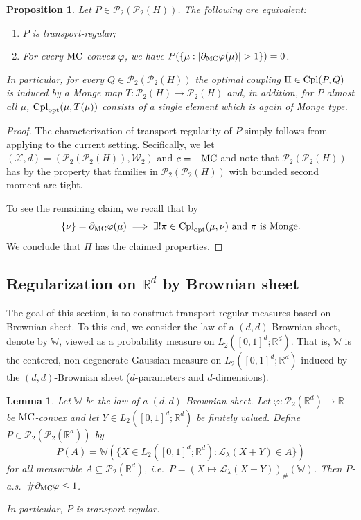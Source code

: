 \documentclass[a4paper]{amsart}
\numberwithin{theorem}{section}
\newtheorem{lemma}[theorem]{Lemma}
\newtheorem{proposition}[theorem]{Proposition}
\theoremstyle{definition}
\newcommand{\R}{\mathbb{R}}
\newcommand{\law}{\mathcal{L}}
\newcommand{\cpl}{\textup{Cpl}}
\newcommand{\W}{\mathcal{W}}
\newcommand{\WW}{\mathbb{W}}
\newcommand{\Pc}{\mathcal P}
\newcommand{\cplopt}{\cpl_{\rm opt}}
\renewcommand{\H}{H}
\renewcommand{\phi}{\varphi}
\newcommand{\mc}{\textup{MC}}
\begin{document}
\begin{proposition} \label{prop:TR=>HMonge}
    Let $P \in \Pc_2(\Pc_2(\H))$. The following are equivalent:
    \begin{enumerate}
        \item $P$ is transport-regular;
        \item For every $\mc$-convex $\phi$, we have $P(\{ \mu : |\partial_\mc \phi(\mu)| > 1 \}) = 0$.
    \end{enumerate}
    In particular, for every $Q \in \Pc_2(\Pc_2(\H))$ the optimal coupling $\Pi \in \cpl(P,Q)$ is induced by a Monge map $T:\Pc_2(\H) \to \Pc_2(\H)$ and, in addition, for $P$ almost all $\mu$, $\cplopt(\mu, T(\mu))$  consists of a single element which is again of Monge type.
\end{proposition}

\begin{proof}
    The characterization of transport-regularity of $P$ simply follows from applying  to the current setting. Secifically, we let $(\mathcal X,d) = (\Pc_2(\Pc_2(\H)),\W_2)$ and $c = -\mc$ and note that $\Pc_2(\Pc_2(\H))$ has by \cite[Lemma 2.3]{BaBePa18} the property that families in $\Pc_2(\Pc_2(\H))$ with bounded second moment are tight.

    To see the remaining claim, we recall that by 
    \[
        \{ \nu \} = \partial_\mc \phi(\mu) \implies
        \exists! \pi \in \cplopt(\mu,\nu) \text{ and }\pi\text{ is Monge}.
    \]
    We conclude that $\Pi$ has the claimed properties.
\end{proof}




\subsection{Regularization on $\R^d$ by Brownian sheet}

The goal of this section, is to construct transport regular measures based on Brownian sheet.
To this end, we consider the law of a $(d,d)$-Brownian sheet, denote by $\mathbb W$, viewed as a probability measure on $L_2([0,1]^d;\R^d)$.
That is, $\mathbb W$ is the centered, non-degenerate Gaussian measure on $L_2([0,1]^d;\R^d)$ induced by the $(d,d)$-Brownian sheet ($d$-parameters and $d$-dimensions).

\begin{lemma} \label{lem:BMDifferentiable}
    Let $\mathbb W$ be the law of a $(d,d)$-Brownian sheet.
    Let $\phi : \Pc_2(\R^d) \to \R $ be $\mc$-convex and let $Y \in L_2([0,1]^d;\R^d)$ be finitely valued.
    Define $P\in \Pc_2(\Pc_2(\R^d))$ by $$P(A) = \WW(\{X\in L_2([0,1]^d;\R^d): \law_\lambda (X + Y) \in A \})$$ for all measurable $A\subseteq \Pc_2(\R^d)$, i.e.\ $P = (X \mapsto \law_\lambda(X+Y))_{\#} (\WW)$.
    Then $P$-a.s.\ $\# \partial_\mc\phi \leq 1$.

    In particular, $P$ is transport-regular.
\end{lemma}
\end{document}
